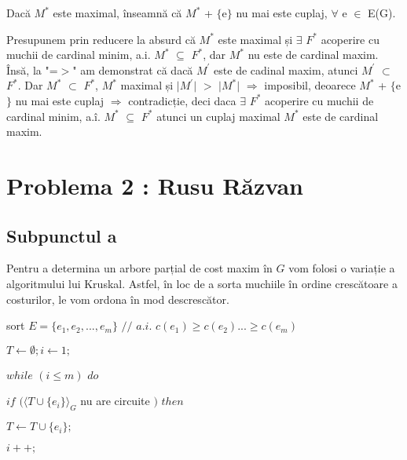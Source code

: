 \documentclass{article}
\begin{document}
{{Dacă $M^*$ este maximal, înseamnă că $M^*$ + $\lbrace$e$\rbrace$ nu mai este cuplaj, $\forall$ e $\in$ E(G). 

Presupunem prin reducere la absurd că $M^*$ este maximal și $\exists$ $F^*$ acoperire cu muchii de cardinal minim, a.i.  $M^*$ $\subseteq$ $F^*$, dar $M^*$ nu este de cardinal maxim. Însă, la "=$>$" am demonstrat că dacă $M^{'}$ este de cadinal maxim, atunci $M^{'}$ $\subset$ $F^*$. Dar $M^*$ $\subset$ $F^*$, $M^*$ maximal și $\vert$$M^{'}$$\vert$ $>$ $\vert$$M^*$$\vert$ $\Rightarrow$ imposibil, deoarece $M^*$ + $\lbrace$e$\rbrace$ nu mai este cuplaj $\Rightarrow$ contradicție, deci daca $\exists$ $F^*$ acoperire cu muchii de cardinal minim, a.î.  $M^*$ $\subseteq$ $F^*$ atunci un cuplaj maximal $M^*$ este de cardinal maxim.

\section*{\fontsize{20}{50}\selectfont Problema 2 : Rusu Răzvan}
\subsection*{\fontsize{16}{30}\selectfont Subpunctul a}
{\fontsize{14}{16}\selectfont 
Pentru a determina un arbore parțial de cost maxim în $G$ vom folosi o variație a algoritmului lui Kruskal. Astfel, în loc de a sorta muchiile în ordine crescătoare a costurilor, le vom ordona în mod descrescător.
    \\ 
    \par sort $E=\lbrace e_1, e_2, ..., e_m \rbrace$ $//$ $a.i.$  $c(e_1)\geq c(e_2)...\geq c(e_m)$

    \par $T \leftarrow \emptyset; i \leftarrow 1;$
    \par $while$  $(i \leq m)$  $do$
    \par \hspace*{1cm} $if$ $(\langle T \cup \lbrace e_i \rbrace \rangle _G$ nu are circuite $)$  $then$
    \par \hspace*{1.5cm} $ T \leftarrow T \cup \lbrace e_i \rbrace ;$
    \par \hspace*{1cm} $i++;$
    }

}}
\end{document}
